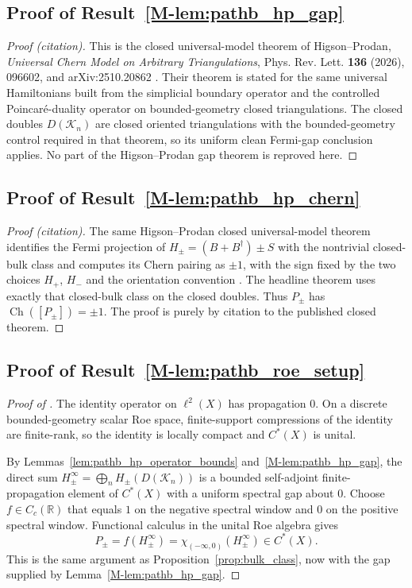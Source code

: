 \documentclass[11pt]{article}
\numberwithin{equation}{section}
\theoremstyle{definition}
\theoremstyle{remark}
\newcommand{\K}{\mathcal{K}}
\newcommand{\Ch}{\operatorname{Ch}}
\begin{document}
\subsection{Proof of Result~\ref{M-lem:pathb_hp_gap}}\label{app:proof:lem:pathb_hp_gap}
\begin{proof}[Proof (citation)]
This is the closed universal-model theorem of Higson--Prodan,
\emph{Universal Chern Model on Arbitrary Triangulations}, Phys. Rev. Lett. \textbf{136} (2026),
096602, and arXiv:2510.20862 \cite{HigsonProdanUniversalPRL,HigsonProdanUniversalArxiv}. Their
theorem is stated for the same universal Hamiltonians built from the simplicial boundary operator
and the controlled Poincar\'e-duality operator on bounded-geometry closed triangulations. The closed
doubles \(D(\K_n)\) are closed oriented triangulations with the bounded-geometry
control required in that theorem, so its uniform clean Fermi-gap conclusion applies. No part of the
Higson--Prodan gap theorem is reproved here.
\end{proof}

\subsection{Proof of Result~\ref{M-lem:pathb_hp_chern}}\label{app:proof:lem:pathb_hp_chern}
\begin{proof}[Proof (citation)]
The same Higson--Prodan closed universal-model theorem identifies the Fermi projection of
\(H_\pm=(B+B^\dagger)\pm S\) with the nontrivial closed-bulk class and computes its Chern pairing as
\(\pm1\), with the sign fixed by the two choices \(H_+\), \(H_-\) and the orientation convention
\cite{HigsonProdanUniversalPRL,HigsonProdanUniversalArxiv}. The headline theorem uses exactly that
closed-bulk class on the closed doubles. Thus \(P_\pm\) has \(\Ch([P_\pm])=\pm1\). The proof is purely by
citation to the published closed theorem.
\end{proof}

\subsection{Proof of Result~\ref{M-lem:pathb_roe_setup}}\label{app:proof:lem:pathb_roe_setup}
\begin{proof}[Proof of ]
The identity operator on \(\ell^2(X)\) has propagation \(0\). On a discrete bounded-geometry scalar
Roe space, finite-support compressions of the identity are finite-rank, so the identity is locally
compact and \(C^*(X)\) is unital.

By Lemmas~\ref{lem:pathb_hp_operator_bounds} and~\ref{M-lem:pathb_hp_gap}, the direct sum
\(H_\pm^\infty=\bigoplus_n H_\pm(D(\K_n))\) is a bounded self-adjoint finite-propagation element of
\(C^*(X)\) with a uniform spectral gap about \(0\). Choose \(f\in C_c(\mathbb R)\) that equals
\(1\) on the negative spectral window and \(0\) on the positive spectral window. Functional calculus
in the unital Roe algebra gives
\[
P_\pm=f(H_\pm^\infty)=\chi_{(-\infty,0)}(H_\pm^\infty)\in C^*(X).
\]
This is the same argument as Proposition~\ref{prop:bulk_class}, now with the gap supplied by
Lemma~\ref{M-lem:pathb_hp_gap}.
\end{proof}
\end{document}
